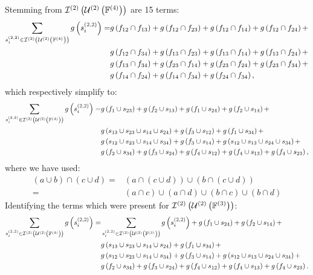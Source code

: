 \documentclass[11pt]{article}
\newcommand{\gxn}[1]{g\left(#1\right)}
\newcommand{\smem}[2]{s^{\left(#1\right)}_{#2}}
\begin{document}
Stemming from $\mathcal{I}^{(2)}\left(\mathcal{U}^{(2)}\left(\mathbb{F}^{(4)}\right)\right)$ are 15 terms:
\begin{align}
	\sum_{\smem{2,2}{i}\in\intsset{2}{2}{4}}\gxn{\smem{2,2}{i}} =
	  & \gxn{\IDiDj} + \gxn{\IDiDk} + \gxn{\IDiDl} + \gxn{\IDiDm} +\nonumber\\
	  & \gxn{\IDiDn} + \gxn{\IDjDk} + \gxn{\IDjDl} + \gxn{\IDjDm} +\nonumber\\
	  & \gxn{\IDjDn} + \gxn{\IDkDl} + \gxn{\IDkDm} + \gxn{\IDkDn} +\nonumber\\
	  & \gxn{\IDlDm} + \gxn{\IDlDn} + \gxn{\IDmDn},
\end{align}
which respectively simplify to:
\begin{align}
	\sum_{\smem{2,2}{i}\in\intsset{2}{2}{4}}\gxn{\smem{2,2}{i}} =
	& \gxn{f_1\cup\Ik} + \gxn{f_2\cup\Ij} + \gxn{f_1\cup\In} +
	  \gxn{f_2\cup\Il} + \nonumber\\
	& \gxn{\Ij\cup\Ik\cup\Il\cup\In} + \gxn{f_3\cup\Ii} +
	  \gxn{f_1\cup\Io} + \nonumber\\
	& \gxn{\Ii\cup\Ik\cup\Il\cup\Io} + \gxn{f_3\cup\Il}
	+ \gxn{\Ii\cup\Ij\cup\In\cup\Io} + \nonumber\\
	& \gxn{f_2\cup\Io} + \gxn{f_3\cup\In} + \gxn{f_4\cup\Ii} +
	  \gxn{f_4\cup\Ij} + \gxn{f_4\cup\Ik},
\end{align}
where we have used:
\begin{align}
	\left(a\cup b\right)\cap\left(c\cup d\right) =&
	  \left(a\cap\left(c\cup d\right)\right)\cup
	  \left(b\cap\left(c\cup d\right)\right)\nonumber\\
	   =& \left(a\cap c\right)\cup\left(a\cap d\right)\cup
          \left(b\cap c\right)\cup\left(b\cap d\right)
\end{align}
Identifying the terms which were present for $\mathcal{I}^{(2)}\left(\mathcal{U}^{(2)}\left(\mathbb{F}^{(3)}\right)\right)$:
\begin{align}
	\sum_{\smem{2,2}{i}\in\intsset{2}{2}{4}}\gxn{\smem{2,2}{i}} =
	& \sum_{\smem{2,2}{i}\in\intsset{2}{2}{3}}\gxn{\smem{2,2}{i}} +
      \gxn{f_1\cup\In} + \gxn{f_2\cup\Il} + \nonumber\\
	& \gxn{\Ij\cup\Ik\cup\Il\cup\In}  +  \gxn{f_1\cup\Io} + \nonumber\\
	& \gxn{\Ii\cup\Ik\cup\Il\cup\Io} + \gxn{f_3\cup\Il}
	+ \gxn{\Ii\cup\Ij\cup\In\cup\Io} + \nonumber\\
	& \gxn{f_2\cup\Io} + \gxn{f_3\cup\In} + \gxn{f_4\cup\Ii} +
	\gxn{f_4\cup\Ij} + \gxn{f_4\cup\Ik}.
\end{align}
\end{document}

